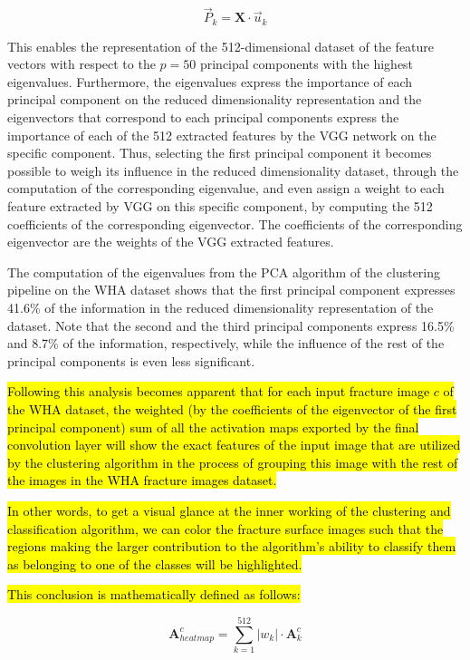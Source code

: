\documentclass[authoryear,preprint,review,12pt, singleside]{elsarticle}
\begin{document}
\begin{equation*}
\vec{P}_k = \textbf{X} \cdot \vec{u}_k
\end{equation*}

This enables the representation of the 512-dimensional dataset of the feature vectors with respect to the $p=50$ principal components with the highest eigenvalues. Furthermore, the eigenvalues express the importance of each principal component on the reduced dimensionality representation and the eigenvectors that correspond to each principal components express the importance of each of the 512 extracted features by the VGG network on the specific component. Thus, selecting the first principal component it becomes possible to weigh its influence in the reduced dimensionality dataset, through the computation of the corresponding eigenvalue, and even assign a weight to each feature extracted by VGG on this specific component, by computing the 512 coefficients of the corresponding eigenvector. The coefficients of the corresponding eigenvector are the weights of the VGG extracted features.

The computation of the eigenvalues from the PCA algorithm of the clustering pipeline on the WHA dataset shows that the first principal component expresses 41.6\% of the information in the reduced dimensionality representation of the dataset. Note that the second and the third principal components express 16.5\% and 8.7\% of the information, respectively, while the influence of the rest of the principal components is even less significant.  


\hl{Following this analysis becomes apparent that for each input fracture image $c$ of the WHA dataset, the weighted (by the coefficients of the eigenvector of the first principal component) sum of all the activation maps exported by the final convolution layer will show the exact features of the input image that are utilized by the clustering algorithm in the process of grouping this image with the rest of the images in the WHA fracture images dataset. }

\hl{In other words, to get a visual glance at the inner working of the clustering and classification algorithm, we can color the fracture surface images such that the regions making the larger contribution to the algorithm's ability to classify them as belonging to one of the classes will be highlighted. }

\hl{This conclusion is mathematically defined as follows:}

\begin{equation*}
\textbf{A}_{heatmap}^c = \sum_{k=1}^{512} |w_k| \cdot \textbf{A}^c_k 
\end{equation*}  
\end{document}
